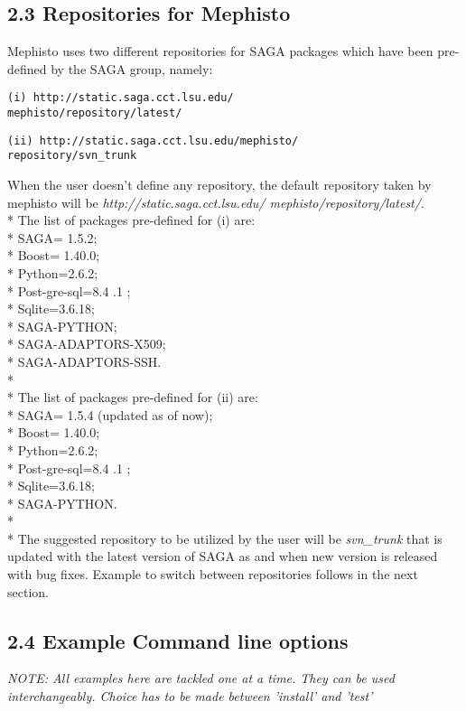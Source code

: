 \documentclass[a4paper,10pt]{article}
\begin{document}
\begin{multicols}{2}
\subsection*{\normalsize 2.3 Repositories for Mephisto} 
Mephisto uses two different repositories for SAGA packages which have been
pre-defined by the SAGA group, namely: 
\begin{verbatim}
(i) http://static.saga.cct.lsu.edu/
mephisto/repository/latest/
\end{verbatim}
\begin{verbatim}
(ii) http://static.saga.cct.lsu.edu/mephisto/
repository/svn_trunk
\end{verbatim}
When the user doesn't define any repository, the default 
repository taken by mephisto will be \emph {http://static.saga.cct.lsu.edu/
mephisto/repository/latest/}. \\*
The list of packages pre-defined for (i) are: \\*
SAGA= 1.5.2; \\*
Boost= 1.40.0; \\*
Python=2.6.2; \\*
Post-gre-sql=8.4 .1 ; \\*
Sqlite=3.6.18;   \\*
SAGA-PYTHON; \\*
SAGA-ADAPTORS-X509; \\*
SAGA-ADAPTORS-SSH.  \\*\\*
The list of packages pre-defined for (ii) are: \\*
SAGA= 1.5.4 (updated as of now); \\*
Boost= 1.40.0; \\*
Python=2.6.2; \\*
Post-gre-sql=8.4 .1 ; \\*
Sqlite=3.6.18;   \\*
SAGA-PYTHON. \\*\\*
The suggested repository to be utilized by the user will be \emph{svn\_trunk} 
that is updated with the latest version of SAGA as and when
new version is released with bug fixes. Example to switch between 
repositories follows in the next section. 
\subsection*{\normalsize 2.4 Example Command line options}
\emph{NOTE: All examples here are tackled one at a time. They can be used interchangeably.
Choice has to be made between 'install' and 'test'}

\end{multicols}
\end{document}
